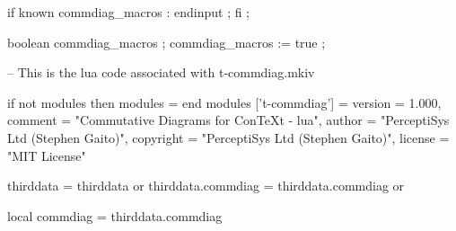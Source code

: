 \stopMkIVCode

\startMpIVCode


%
%

if known commdiag_macros : endinput ; fi ;

boolean commdiag_macros ; commdiag_macros := true ;

\stopMpIVCode

\startLuaCode
-- This is the lua code associated with t-commdiag.mkiv

if not modules then modules = { } end modules ['t-commdiag'] = {
    version   = 1.000,
    comment   = "Commutative Diagrams for ConTeXt - lua",
    author    = "PerceptiSys Ltd (Stephen Gaito)",
    copyright = "PerceptiSys Ltd (Stephen Gaito)",
    license   = "MIT License"
}

thirddata            = thirddata          or {}
thirddata.commdiag   = thirddata.commdiag or {}

local commdiag       = thirddata.commdiag
\stopLuaCode

\stopchapter